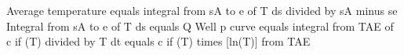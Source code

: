 Average temperature equals integral from sA to e of T ds divided by sA minus se
Integral from sA to e of T ds equals Q
Well
p curve
equals integral from TAE of c if (T) divided by T dt
equals c if (T) times [ln(T)] from TAE